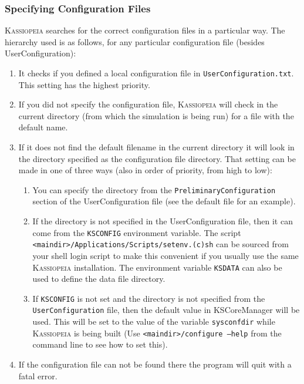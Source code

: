 \subsubsection{Specifying Configuration Files}\label{sec:howto-specifyingconfigfiles}
\textsc{Kassiopeia} searches for the correct configuration files in a particular way.  The hierarchy used is as follows, for any particular configuration file (besides UserConfiguration):
\begin{enumerate}
	\item It checks if you defined a local configuration file in \texttt{UserConfiguration.txt}. This setting has the highest priority.
 	\item If you did not specify the configuration file, \textsc{Kassiopeia} will check in the current directory (from which the simulation is being run) for a file with the default name.
	\item If it does not find the default filename in the current directory it will look in the directory specified as the configuration file directory.  That setting can be made in one of three ways (also in order of priority, from high to low):
	\begin{enumerate}
		\item You can specify the directory from the \texttt{PreliminaryConfiguration} section of the UserConfiguration file (see the default file for an example).
		\item If the directory is not specified in the UserConfiguration file, then it can come from the \texttt{KSCONFIG} environment variable.  The script \texttt{<maindir>/Applications/Scripts/setenv.(c)sh} can be sourced from your shell login script to make this convenient if you usually use the same \textsc{Kassiopeia} installation.  The environment variable \texttt{KSDATA} can also be used to define the data file directory.
		\item If \texttt{KSCONFIG} is not set and the directory is not specified from the \texttt{UserConfiguration} file, then the default value in KSCoreManager will be used.  This will be set to the value of the variable \texttt{sysconfdir} while \textsc{Kassiopeia} is being built (Use \texttt{<maindir>/configure --help} from the command line to see how to set this).
	\end{enumerate}
	\item If the configuration file can not be found there the program will quit with a fatal error. 
\end{enumerate}


